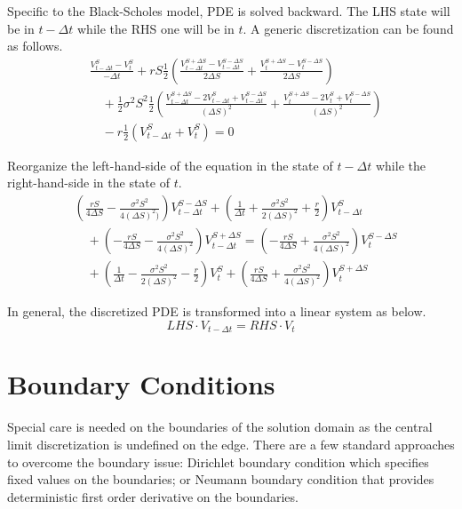 \documentclass{article}
\begin{document}
Specific to the Black-Scholes model, PDE is solved backward. The LHS state will be in $ t - \Delta t $ while the RHS one will be in $ t $.
A generic discretization can be found as follows.
\begin{align}
    & \frac{V_{t - \Delta t}^{S} - V_{t}^{S}}{-\Delta t} + r S \frac{1}{2} \left(\frac{V_{t - \Delta t}^{S + \Delta S} - V_{t - \Delta t}^{S - \Delta S}}{2 \Delta S} + \frac{V_{t}^{S + \Delta S} - V_{t}^{S - \Delta S}}{2 \Delta S}\right) \nonumber \\
    & \quad + \frac{1}{2} \sigma^2 S^2 \frac{1}{2} \left(\frac{V_{t - \Delta t}^{S + \Delta S} - 2 V_{t - \Delta t}^{S} + V_{t - \Delta t}^{S - \Delta S}}{{(\Delta S)}^2} + \frac{V_{t}^{S + \Delta S} - 2 V_{t}^{S} + V_{t}^{S - \Delta S}}{{(\Delta S)}^2} \right) \nonumber \\
    & \quad - r \frac{1}{2} \left(V_{t - \Delta t}^{S} + V_{t}^{S}\right) = 0 \label{BS PDE CN Discretized}
\end{align}

Reorganize the left-hand-side of the equation in the state of $ t - \Delta t $ while the right-hand-side in the state of $ t $.
\begin{align}
    & \left(\frac{r S}{4 \Delta S} - \frac{\sigma^2 S^2}{4 (\Delta S)^2)}\right) V_{t - \Delta t}^{S - \Delta S} + \left(\frac{1}{\Delta t}  + \frac{\sigma^2 S^2}{2 (\Delta S)^2} + \frac{r}{2}\right) V_{t - \Delta t}^{S} \nonumber \\
    & \quad + \left(-\frac{r S}{4 \Delta S} - \frac{\sigma^2 S^2}{4 (\Delta S)^2}\right) V_{t - \Delta t}^{S + \Delta S} = \left(-\frac{r S}{4 \Delta S} + \frac{\sigma^2 S^2}{4 (\Delta S)^2}\right) V_{t}^{S - \Delta S} \nonumber \\
    & \quad + \left(\frac{1}{\Delta t} - \frac{\sigma^2 S^2}{2 (\Delta S)^2} - \frac{r}{2}\right) V_{t}^{S} + \left(\frac{r S}{4 \Delta S} + \frac{\sigma^2 S^2}{4 (\Delta S)^2}\right) V_{t}^{S + \Delta S}
\end{align}

In general, the discretized PDE is transformed into a linear system as below.
\begin{equation}
    {LHS} \cdot V_{t - \Delta t} = {RHS} \cdot V_{t}
\end{equation}


\section{Boundary Conditions}

Special care is needed on the boundaries of the solution domain as the central limit discretization is undefined on the edge.
There are a few standard approaches to overcome the boundary issue:
Dirichlet boundary condition which specifies fixed values on the boundaries;
or Neumann boundary condition that provides deterministic first order derivative on the boundaries. 
\end{document}
